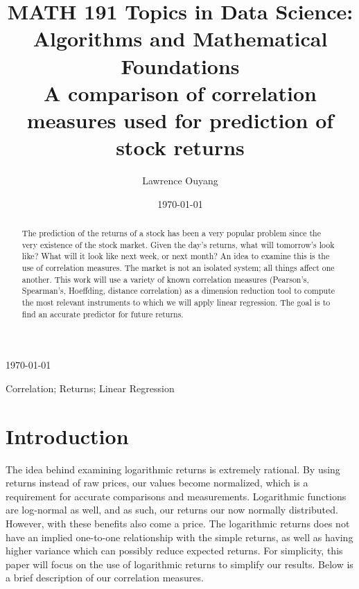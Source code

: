 \documentclass[10pt]{siamltex}
\begin{document}
\title{MATH 191 Topics in Data Science: \\ Algorithms and Mathematical Foundations \\ A comparison of correlation measures used for prediction of stock returns }
\author{Lawrence Ouyang}
\date{\today}
\maketitle

\begin{center}
     \today
\end{center}

\vspace{5mm}

\begin{abstract}
The prediction of the returns of a stock has been a very popular problem since the very existence of the stock market. Given the day's returns, what will tomorrow's look like? What will it look like next week, or next month? An idea to examine this is the use of correlation measures. The market is not an isolated system; all things affect one another. This work will use a variety of known correlation measures (Pearson's, Spearman's, Hoeffding, distance correlation) as a dimension reduction tool to compute the most relevant instruments to which we will apply linear regression. The goal is to find an accurate predictor for future returns. 
\end{abstract}


\begin{keywords} Correlation; Returns; Linear Regression
\end{keywords}


\section{Introduction}

The idea behind examining logarithmic returns is extremely rational. By using returns instead of raw prices, our values become normalized, which is a requirement for accurate comparisons and measurements. Logarithmic functions are log-normal as well, and as such, our returns our now normally distributed. However, with these benefits also come a price. The logarithmic returns does not have an implied one-to-one relationship with the simple returns, as well as having higher variance which can possibly reduce expected returns\cite{CompLogSimRet}. For simplicity, this paper will focus on the use of logarithmic returns to simplify our results. Below is a brief description of our correlation measures.
\end{document}
